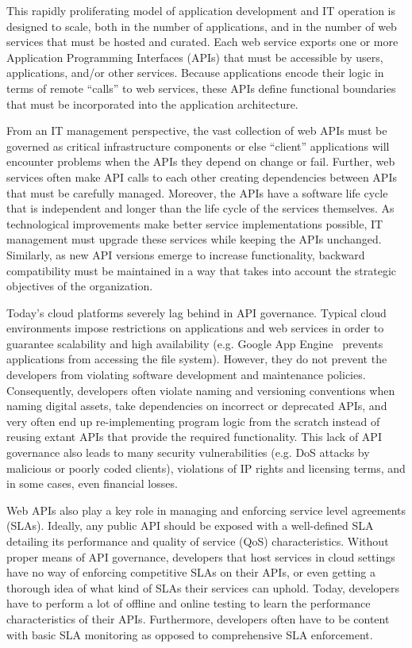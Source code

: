 This rapidly proliferating model of application development and IT operation
is designed to scale, both in the number of applications, 
and in the number of web services that must be
hosted and curated.  Each web service exports one or more Application Programming
Interfaces (APIs) that must be accessible by users, applications, and/or
other services.
Because applications encode their logic in terms of
remote ``calls'' to web services,
these APIs define functional boundaries that must be incorporated into the
application architecture.  

From an IT management perspective, the vast collection of web APIs must be
governed as critical infrastructure components or else ``client'' applications
will encounter problems when the APIs they depend on change or fail.  
Further, web services often make API calls to each other 
creating dependencies between APIs that must be carefully managed.
Moreover, the APIs have a software life cycle that is
independent and longer than the life cycle of the services themselves. 
As technological improvements make better service implementations possible, IT
management must upgrade these services while keeping the APIs unchanged.
Similarly, as new API versions emerge to increase functionality, backward
compatibility must be maintained in a way that takes into
account the strategic objectives of the organization.  

Today's cloud platforms severely lag behind in 
API governance. Typical cloud environments impose restrictions
on applications and web services in order to guarantee scalability
and high availability (e.g. Google App Engine~\cite{gae} prevents applications from accessing
the file system). 
However, they do not prevent the developers from violating
software development and maintenance policies. 
Consequently, developers often violate naming and versioning conventions
when naming digital assets, take dependencies
on incorrect or deprecated APIs, and very often end up re-implementing program logic
from the scratch instead of reusing extant APIs that provide the required functionality.
This lack of API governance also leads to many security vulnerabilities (e.g. DoS attacks
by malicious or poorly coded clients), violations of IP rights and licensing terms, and in
some cases, even financial losses. 

Web APIs also play a key role in managing and enforcing service level agreements (SLAs).
Ideally, any public API should be exposed with a well-defined
SLA detailing its performance and quality of service (QoS) characteristics. Without proper means
of API governance, developers that host services in cloud settings have no way of enforcing
competitive SLAs on their APIs, or even getting a thorough idea of what kind of SLAs
their services can uphold. Today, developers have to perform a lot of offline
and online testing to learn the performance characteristics of their APIs.
Furthermore, developers often have to be content with basic SLA monitoring 
as opposed to comprehensive SLA enforcement. 

